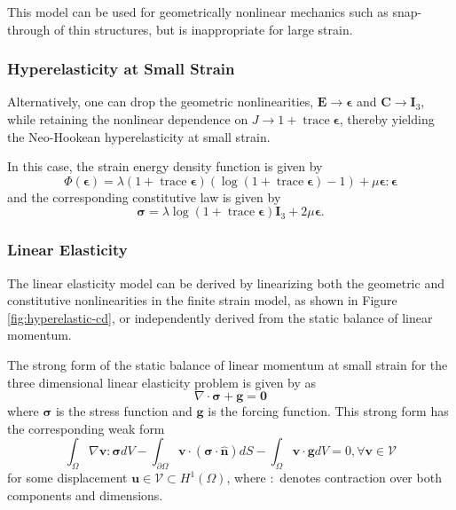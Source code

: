 This model can be used for geometrically nonlinear mechanics such as snap-through of thin structures, but is inappropriate for large strain.

\subsubsection{Hyperelasticity at Small Strain}

Alternatively, one can drop the geometric nonlinearities, $\mathbf E \to \boldsymbol \epsilon$ and $\mathbf C \to \mathbf I_3$, while retaining the nonlinear dependence on $J \to 1 + \operatorname{trace} \boldsymbol \epsilon$, thereby yielding the Neo-Hookean hyperelasticity at small strain.

In this case, the strain energy density function is given by
\begin{equation}
\Phi \left( \boldsymbol \epsilon \right) = \lambda \left( 1 + \operatorname{trace} \boldsymbol \epsilon \right) \left( \log \left( 1 + \operatorname{trace} \boldsymbol \epsilon \right) - 1 \right) + \mu \boldsymbol \epsilon : \boldsymbol \epsilon
\end{equation}
and the corresponding constitutive law is given by
\begin{equation}
\boldsymbol \sigma = \lambda \log \left( 1 + \operatorname{trace} \boldsymbol \epsilon \right) \mathbf I_3 + 2 \mu \boldsymbol \epsilon.
\end{equation}

\subsubsection{Linear Elasticity}

The linear elasticity model can be derived by linearizing both the geometric and constitutive nonlinearities in the finite strain model, as shown in Figure \ref{fig:hyperelastic-cd}, or independently derived from the static balance of linear momentum.

The strong form of the static balance of linear momentum at small strain for the three dimensional linear elasticity problem is given by \cite{hughes2012finite} as
\begin{equation}
\nabla \cdot \boldsymbol{\sigma} + \boldsymbol{g} = \boldsymbol{0}
\end{equation}
where $\boldsymbol{\sigma}$ is the stress function and $\boldsymbol{g}$ is the forcing function.
This strong form has the corresponding weak form
\begin{equation}
\int_{\Omega} \nabla \mathbf{v} : \boldsymbol{\sigma} dV - \int_{\partial \Omega} \mathbf{v} \cdot \left( \boldsymbol{\sigma} \cdot \hat{\mathbf{n}} \right) dS - \int_{\Omega} \mathbf{v} \cdot \mathbf{g} dV = 0, \forall \mathbf{v} \in \mathcal{V}
\end{equation}
for some displacement $\mathbf{u} \in \mathcal{V} \subset H^1 \left( \Omega \right)$, where $:$ denotes contraction over both components and dimensions.

